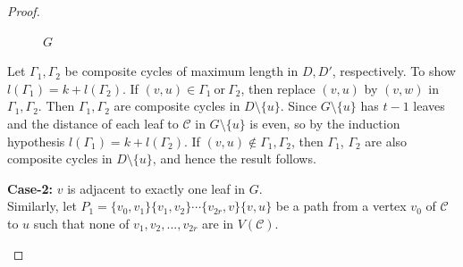 \documentclass[10pt,a4paper]{amsart}
\numberwithin{equation}{section}
\begin{document}
\begin{proof}
\begin{figure}[H]
\begin{tikzpicture}
		\end{tikzpicture}
		\caption{$G$}	
	\end{figure}
	
	Let $\Gamma_1, \Gamma_2$ be composite cycles of maximum length in $D, D'$, respectively. To show $l(\Gamma_1)=k+l(\Gamma_2)$. If $(v,u)\in \Gamma_1~\text{or}~\Gamma_2$, then replace $(v,u)$ by $(v,w)$ in $\Gamma_1,\Gamma_2$. Then $\Gamma_1,\Gamma_2$ are composite cycles in $D\setminus\{u\}$. Since $G\setminus\{u\}$ has $t-1$ leaves and the distance of each leaf to $\mathcal{C}$ in $G\setminus\{u\}$ is even, so by the induction hypothesis $l(\Gamma_1)=k+l(\Gamma_2)$.  If $(v,u)\notin \Gamma_1,\Gamma_2$, then $\Gamma_1$, $\Gamma_2$ are also composite cycles in $D \setminus \{u\}$, and hence the result follows.
	
	
	
	
	
	\textbf{Case-2:} $v$ is adjacent to exactly one leaf in $G$.\\
	Similarly, let $P_1=\{v_0,v_1\}\{v_1,v_2\}\cdots \{v_{2r},v\}\{v,u\}$ be a path from a vertex $v_0$ of $\mathcal{C}$ to $u$ such that none of $v_1,v_2,...,v_{2r}$ are in $V(\mathcal{C})$. 
	\begin{figure}[H]
		\tikzset{node distance=1cm}
		\centering
\end{figure}
\end{proof}
\end{document}
